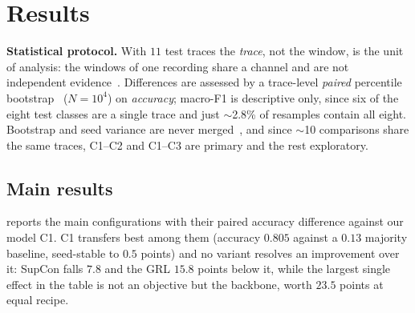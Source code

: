 
\section{Results}
\label{sec:results}

\textbf{Statistical protocol.} With $11$ test traces the \emph{trace}, not the
window, is the unit of analysis: the windows of one recording share a channel
and are not independent evidence~\cite{Hammerla-2015}. Differences are assessed by a trace-level
\emph{paired} percentile bootstrap~\cite{Efron-1993} ($N=10^4$) on \emph{accuracy}; macro-F1 is descriptive
only, since six of the eight test classes are a single trace and just
$\sim$2.8\% of resamples contain all eight. Bootstrap
and seed variance are never merged~\cite{Bouthillier-2021}, and since $\sim$10
comparisons share the same traces, C1--C2 and C1--C3 are primary and the rest
exploratory.

\subsection{Main results}
\label{sec:res_main}

 reports the main configurations with their paired accuracy
difference against our model C1. C1 transfers best among them (accuracy
$0.805$ against a $0.13$ majority baseline, seed-stable to
$0.5$ points) and no variant resolves an improvement over it: SupCon falls
$7.8$ and the GRL $15.8$ points below it, while the largest single effect in
the table is not an objective but the backbone, worth $23.5$ points at equal
recipe.


